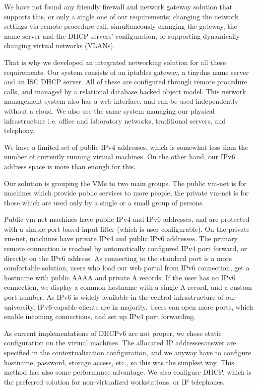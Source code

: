 \documentclass{llncs}
\begin{document}
We have not found any friendly firewall and network gateway solution that supports this, or only a single one of our requirements: changing the network settings via remote procedure call, simultaneously changing the gateway, the name server and the DHCP servers' configuration, or supporting dynamically changing virtual networks (VLANs).

That is why we developed an integrated networking solution for all these requirements. Our system consists of an iptables gateway, a tinydns name server and an ISC DHCP server. All of these are configured through remote procedure calls, and managed by a relational database backed object model. This network management system also has a web interface, and can be used independently without a cloud. We also use the same system managing our physical infrastructure i.e. office and laboratory networks, traditional servers, and telephony.

We have a limited set of public IPv4 addresses, which is somewhat less than the number of currently running virtual machines. On the other hand, our IPv6 address space is more than enough for this.

Our solution is grouping the VMs to two main groups. The public vm-net is for machines which provide public services to more people, the private vm-net is for those which are used only by a single or a small group of persons.

Public vm-net machines have public IPv4 and IPv6 addresses, and are protected with a simple port based input filter (which is user-configurable). On the private vm-net, machines have private IPv4 and public IPv6 addresses. The primary remote connection is reached by automatically configured IPv4 port forward, or directly on the IPv6 address. As connecting to the standard port is a more comfortable solution, users who load our web portal from IPv6 connection, get a hostname with public AAAA and private A records. If the user has no IPv6 connection, we display a common hostname with a single A record, and a custom port number. As IPv6 is widely available in the central infrastructure of our university, IPv6-capable clients are in majority. Users can open more ports, which enable incoming connections, and set up IPv4 port forwarding.

As current implementations of DHCPv6 are not proper, we chose static configuration on the virtual machines. The allocated IP addressesanswer are specified in the contextualization configuration, and we anyway have to configure hostname, password, storage access, etc., so this was the simplest way. This method has also some performance advantage. We also configure DHCP, which is the preferred solution for non-virtualized workstations, or IP telephones.
\end{document}
